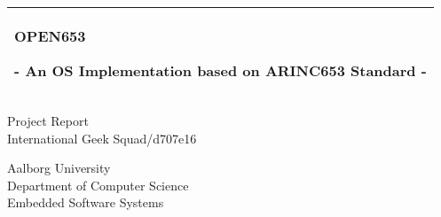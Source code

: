 %
\begin{titlepage}
	\addtolength{\hoffset}{0.5\evensidemargin-0.5\oddsidemargin} %
	\noindent%
	\begin{tabular}{@{}p{\textwidth}@{}}
		\toprule[2pt]
		\midrule
		\vspace{0.2cm}
		\begin{center}
			\Huge{\textbf{
				OPEN653
			}}
		\end{center}
		\begin{center}
			\Large{
				- An OS Implementation based on ARINC653 Standard -
			}
		\end{center}
		\vspace{0.2cm}\\
		\midrule
		\toprule[2pt]
	\end{tabular}
	\vspace{4 cm}
	\begin{center}
		{\large
			Project Report
		}\\
		\vspace{0.2cm}
		{\Large
			International Geek Squad/d707e16
		}
	\end{center}
	\vfill
	\begin{center}
		Aalborg University\\
		Department of Computer Science\\
		Embedded Software Systems
	\end{center}
\end{titlepage}
\clearpage
